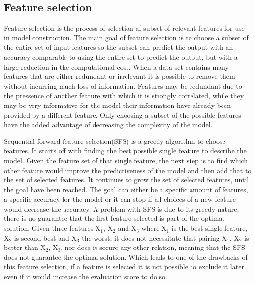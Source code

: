 \subsection{Feature selection}
Feature selection is the process of selection af subset of relevant features for use in model construction.
The main goal of feature selection is to choose a subset of the entire set of input features so the subset can predict the output with an accuracy comparable to using the entire set to predict the output, but with a large reduction in the computational cost.
When a data set contains many features that are either redundant or irrelevant it is possible to remove them without incurring much loss of information. Features may be redundant due to the pressence of another feature with which it is strongly correlated, while they may be very informative for the model their information have already been provided by a different feature. Only choosing a subset of the possible features have the added advantage of decreasing the complexity of the model.

Sequential forward feature selection(SFS) is a greedy algorithm to choose features.
It starts off with finding the best possible single feature to describe the model. Given the feature set of that single feature, the next step is to find which other feature would improve the predictiveness of the model and then add that to the set of selected features. It continues to grow the set of selected features, until the goal have been reached. The goal can either be a specific amount of features, a specific accuracy for the model or it can stop if all choices of a new feature would decrease the accuracy.
A problem with SFS is due to its greedy nature, there is no guarantee that the first feature selected is part of the optimal solution. Given three features X$_1$, X$_2$ and X$_3$ where X$_1$ is the best single feature, X$_2$ is second best and X$_3$ the worst, it does not necessitate that pairing {X$_1$, X$_2$ } is better than {X$_2$, X$_3$}, nor does it secure any other relation, meaning that the SFS does not guarantee the optimal solution. Which leads to one of the drawbacks of this feature selection, if a feature is selected it is not possible to exclude it later even if it would increase the evaluation score to do so.

